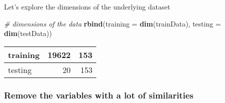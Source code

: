 \documentclass[
]{article}
\newenvironment{Shaded}{\begin{snugshade}}{\end{snugshade}}
\newcommand{\AttributeTok}[1]{\textcolor[rgb]{0.13,0.29,0.53}{#1}}
\newcommand{\CommentTok}[1]{\textcolor[rgb]{0.56,0.35,0.01}{\textit{#1}}}
\newcommand{\ConstantTok}[1]{\textcolor[rgb]{0.56,0.35,0.01}{#1}}
\newcommand{\DecValTok}[1]{\textcolor[rgb]{0.00,0.00,0.81}{#1}}
\newcommand{\FloatTok}[1]{\textcolor[rgb]{0.00,0.00,0.81}{#1}}
\newcommand{\FunctionTok}[1]{\textcolor[rgb]{0.13,0.29,0.53}{\textbf{#1}}}
\newcommand{\NormalTok}[1]{#1}
\newcommand{\OtherTok}[1]{\textcolor[rgb]{0.56,0.35,0.01}{#1}}
\newcommand{\SpecialCharTok}[1]{\textcolor[rgb]{0.81,0.36,0.00}{\textbf{#1}}}
\begin{document}
Let's explore the dimensions of the underlying dataset

\begin{Shaded}
\begin{Highlighting}[]
\CommentTok{\# dimensions of the data}
\FunctionTok{rbind}\NormalTok{(}\AttributeTok{training =} \FunctionTok{dim}\NormalTok{(trainData),}
      \AttributeTok{testing =} \FunctionTok{dim}\NormalTok{(testData))}
\end{Highlighting}
\end{Shaded}

\begin{tabular}{l|r|r}
\hline
training & 19622 & 153\\
\hline
testing & 20 & 153\\
\hline
\end{tabular}

\begin{Shaded}
\end{Shaded}

\hypertarget{remove-the-variables-with-a-lot-of-similarities}{%
\subsubsection{Remove the variables with a lot of
similarities}\label{remove-the-variables-with-a-lot-of-similarities}}

\begin{Shaded}
\end{Shaded}
\end{document}
